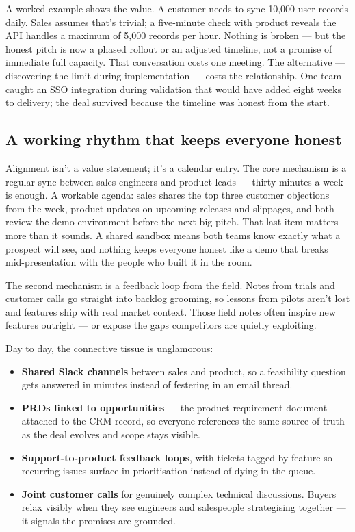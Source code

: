 A worked example shows the value. A customer needs to sync 10,000 user records daily. Sales assumes that's trivial; a five-minute check with product reveals the API handles a maximum of 5,000 records per hour. Nothing is broken — but the honest pitch is now a phased rollout or an adjusted timeline, not a promise of immediate full capacity. That conversation costs one meeting. The alternative — discovering the limit during implementation — costs the relationship. One team caught an SSO integration during validation that would have added eight weeks to delivery; the deal survived because the timeline was honest from the start.



\subsection{A working rhythm that keeps everyone honest}


Alignment isn't a value statement; it's a calendar entry. The core mechanism is a regular sync between sales engineers and product leads — thirty minutes a week is enough. A workable agenda: sales shares the top three customer objections from the week, product updates on upcoming releases and slippages, and both review the demo environment before the next big pitch. That last item matters more than it sounds. A shared sandbox means both teams know exactly what a prospect will see, and nothing keeps everyone honest like a demo that breaks mid-presentation with the people who built it in the room.


The second mechanism is a feedback loop from the field. Notes from trials and customer calls go straight into backlog grooming, so lessons from pilots aren't lost and features ship with real market context. Those field notes often inspire new features outright — or expose the gaps competitors are quietly exploiting.


Day to day, the connective tissue is unglamorous:


\begin{itemize}[leftmargin=*]
\item \textbf{Shared Slack channels} between sales and product, so a feasibility question gets answered in minutes instead of festering in an email thread.
\item \textbf{PRDs linked to opportunities} — the product requirement document attached to the CRM record, so everyone references the same source of truth as the deal evolves and scope stays visible.
\item \textbf{Support-to-product feedback loops}, with tickets tagged by feature so recurring issues surface in prioritisation instead of dying in the queue.
\item \textbf{Joint customer calls} for genuinely complex technical discussions. Buyers relax visibly when they see engineers and salespeople strategising together — it signals the promises are grounded.
\end{itemize}


